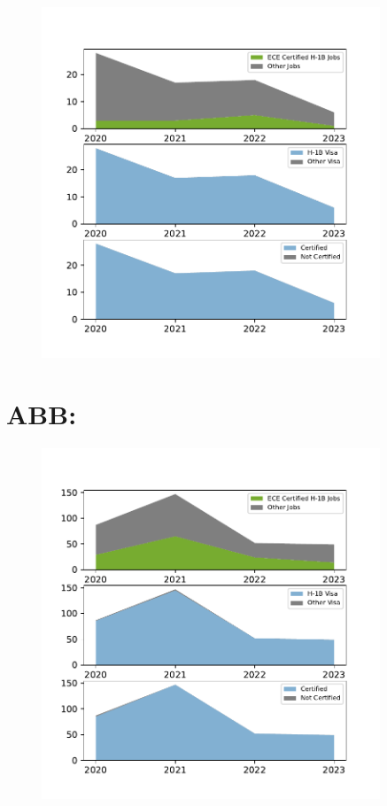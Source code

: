 \documentclass{article}%
\begin{document}
\begin{figure}[h]%
\centering%
\includegraphics[width=0.9\textwidth]{./temp_img/A123SYSTEMS_detailed.pdf}%
\end{figure}

%
\section{ABB:}%
\label{sec:ABB}%


\begin{figure}[h]%
\centering%
\includegraphics[width=0.9\textwidth]{./temp_img/ABB_detailed.pdf}%
\end{figure}
\end{document}
